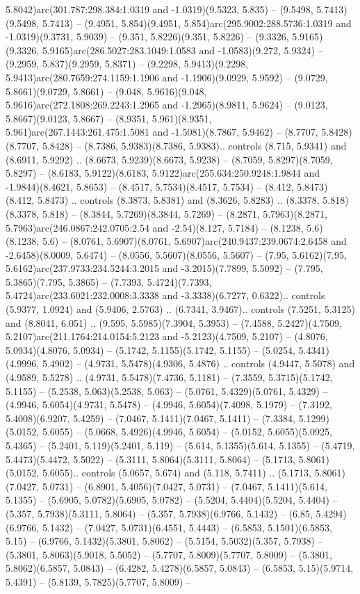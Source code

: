 5.8042)arc(301.787:298.384:1.0319 and -1.0319)(9.5323, 5.835) -- (9.5498, 5.7413)(9.5498, 5.7413) -- (9.4951, 5.854)(9.4951, 5.854)arc(295.9002:288.5736:1.0319 and -1.0319)(9.3731, 5.9039) -- (9.351, 5.8226)(9.351, 5.8226) -- (9.3326, 5.9165)(9.3326, 5.9165)arc(286.5027:283.1049:1.0583 and -1.0583)(9.272, 5.9324) -- (9.2959, 5.837)(9.2959, 5.8371) -- (9.2298, 5.9413)(9.2298, 5.9413)arc(280.7659:274.1159:1.1906 and -1.1906)(9.0929, 5.9592) -- (9.0729, 5.8661)(9.0729, 5.8661) -- (9.048, 5.9616)(9.048, 5.9616)arc(272.1808:269.2243:1.2965 and -1.2965)(8.9811, 5.9624) -- (9.0123, 5.8667)(9.0123, 5.8667) -- (8.9351, 5.961)(8.9351, 5.961)arc(267.1443:261.475:1.5081 and -1.5081)(8.7867, 5.9462) -- (8.7707, 5.8428)(8.7707, 5.8428) -- (8.7386, 5.9383)(8.7386, 5.9383).. controls (8.715, 5.9341) and (8.6911, 5.9292) .. (8.6673, 5.9239)(8.6673, 5.9238) -- (8.7059, 5.8297)(8.7059, 5.8297) -- (8.6183, 5.9122)(8.6183, 5.9122)arc(255.634:250.9248:1.9844 and -1.9844)(8.4621, 5.8653) -- (8.4517, 5.7534)(8.4517, 5.7534) -- (8.412, 5.8473)(8.412, 5.8473) .. controls (8.3873, 5.8381) and (8.3626, 5.8283) .. (8.3378, 5.818)(8.3378, 5.818) -- (8.3844, 5.7269)(8.3844, 5.7269) -- (8.2871, 5.7963)(8.2871, 5.7963)arc(246.0867:242.0705:2.54 and -2.54)(8.127, 5.7184) -- (8.1238, 5.6)(8.1238, 5.6) -- (8.0761, 5.6907)(8.0761, 5.6907)arc(240.9437:239.0674:2.6458 and -2.6458)(8.0009, 5.6474) -- (8.0556, 5.5607)(8.0556, 5.5607) -- (7.95, 5.6162)(7.95, 5.6162)arc(237.9733:234.5244:3.2015 and -3.2015)(7.7899, 5.5092) -- (7.795, 5.3865)(7.795, 5.3865) -- (7.7393, 5.4724)(7.7393, 5.4724)arc(233.6021:232.0008:3.3338 and -3.3338)(6.7277, 0.6322).. controls (5.9377, 1.0924) and (5.9406, 2.5763) .. (6.7341, 3.9467).. controls (7.5251, 5.3125) and (8.8041, 6.051) .. (9.595, 5.5985)(7.3904, 5.3953) -- (7.4588, 5.2427)(4.7509, 5.2107)arc(211.1764:214.0154:5.2123 and -5.2123)(4.7509, 5.2107) -- (4.8076, 5.0934)(4.8076, 5.0934) -- (5.1742, 5.1155)(5.1742, 5.1155) -- (5.0254, 5.4341)(4.9996, 5.4902) -- (4.9731, 5.5478)(4.9306, 5.4876) .. controls (4.9447, 5.5078) and (4.9589, 5.5278) .. (4.9731, 5.5478)(7.4736, 5.1181) -- (7.3559, 5.3715)(5.1742, 5.1155) -- (5.2538, 5.063)(5.2538, 5.063) -- (5.0761, 5.4329)(5.0761, 5.4329) -- (4.9946, 5.6054)(4.9731, 5.5478) -- (4.9946, 5.6054)(7.4098, 5.1979) -- (7.3192, 5.4008)(6.9207, 5.4259) -- (7.0467, 5.1411)(7.0467, 5.1411) -- (7.3384, 5.1299)(5.0152, 5.6055) -- (5.0668, 5.4926)(4.9946, 5.6054) -- (5.0152, 5.6055)(5.0925, 5.4365) -- (5.2401, 5.119)(5.2401, 5.119) -- (5.614, 5.1355)(5.614, 5.1355) -- (5.4719, 5.4473)(5.4472, 5.5022) -- (5.3111, 5.8064)(5.3111, 5.8064) -- (5.1713, 5.8061)(5.0152, 5.6055).. controls (5.0657, 5.674) and (5.118, 5.7411) .. (5.1713, 5.8061)(7.0427, 5.0731) -- (6.8901, 5.4056)(7.0427, 5.0731) -- (7.0467, 5.1411)(5.614, 5.1355) -- (5.6905, 5.0782)(5.6905, 5.0782) -- (5.5204, 5.4404)(5.5204, 5.4404) -- (5.357, 5.7938)(5.3111, 5.8064) -- (5.357, 5.7938)(6.9766, 5.1432) -- (6.85, 5.4294)(6.9766, 5.1432) -- (7.0427, 5.0731)(6.4551, 5.4443) -- (6.5853, 5.1501)(6.5853, 5.15) -- (6.9766, 5.1432)(5.3801, 5.8062) -- (5.5154, 5.5032)(5.357, 5.7938) -- (5.3801, 5.8063)(5.9018, 5.5052) -- (5.7707, 5.8009)(5.7707, 5.8009) -- (5.3801, 5.8062)(6.5857, 5.0843) -- (6.4282, 5.4278)(6.5857, 5.0843) -- (6.5853, 5.15)(5.9714, 5.4391) -- (5.8139, 5.7825)(5.7707, 5.8009) -- 